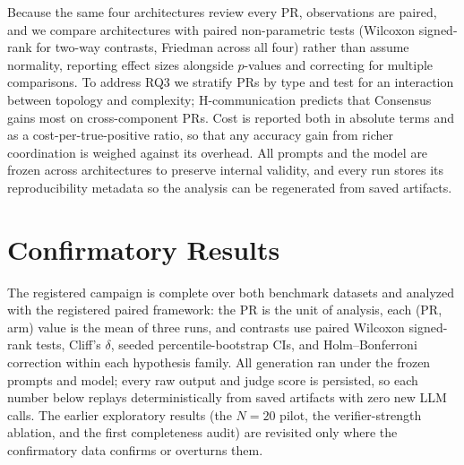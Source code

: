 \documentclass[conference]{IEEEtran}
\begin{document}
Because the same four architectures review every PR, observations are
paired, and we compare architectures with paired non-parametric tests
(Wilcoxon signed-rank for two-way contrasts, Friedman across all four)
rather than assume normality, reporting effect sizes alongside $p$-values
and correcting for multiple comparisons. To address RQ3 we stratify PRs by
type and test for an interaction between topology and complexity;
H-communication predicts that Consensus gains most on cross-component PRs.
Cost is reported both in absolute terms and as a cost-per-true-positive
ratio, so that any accuracy gain from richer coordination is weighed against
its overhead. All prompts and the model are frozen across architectures to
preserve internal validity, and every run stores its reproducibility
metadata so the analysis can be regenerated from saved artifacts.

\section{Confirmatory Results}
\label{sec:results}

The registered campaign is complete over both benchmark datasets and
analyzed with the registered paired framework: the PR is the unit of
analysis, each (PR, arm) value is the mean of three runs, and contrasts
use paired Wilcoxon signed-rank tests, Cliff's $\delta$, seeded
percentile-bootstrap CIs, and Holm--Bonferroni correction within each
hypothesis family. All generation ran under the frozen prompts and model;
every raw output and judge score is persisted, so each number below
replays deterministically from saved artifacts with zero new LLM calls.
The earlier exploratory results (the $N{=}20$ pilot, the verifier-strength
ablation, and the first completeness audit) are revisited only where the
confirmatory data confirms or overturns them.
\end{document}
